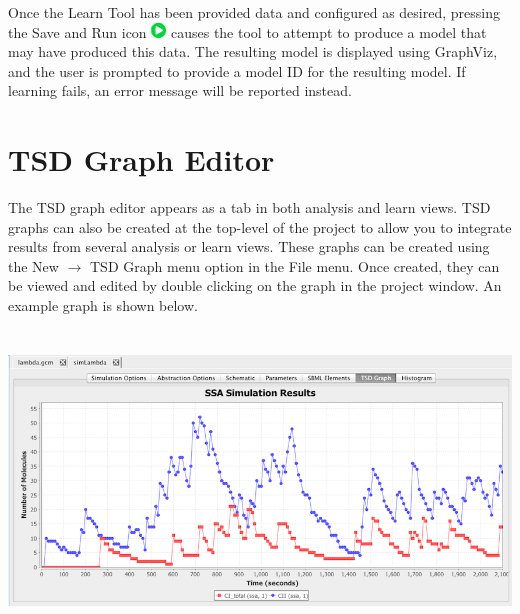 \documentclass[titlepage,11pt]{article}
\begin{document}
Once the Learn Tool has been provided data and configured as desired, pressing the Save and Run icon \includegraphics{../gui/icons/run-icon} causes the tool to attempt to produce a model that may have produced this data.  The resulting model is displayed using GraphViz, and the user is prompted to provide a model ID for the resulting model.  If learning fails, an error message will be reported instead.

\clearpage

\section{\label{TSDGraph}TSD Graph Editor}

\noindent
The TSD graph editor appears as a tab in both analysis and learn views.  TSD graphs can also be created at the top-level of the project to allow you to integrate results from several analysis or learn views. These graphs can be created using the New $\rightarrow$ TSD Graph menu option in the File menu. Once created, they can be viewed and edited by double clicking on the graph in the project window.  An example graph is shown below.

\begin{center}
\includegraphics[height=80mm]{screenshots/ssaSimResults}
\end{center}
\end{document}
